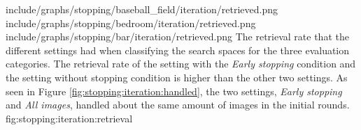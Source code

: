 \tripfigure
{include/graphs/stopping/baseball_field/iteration/retrieved.png}
{include/graphs/stopping/bedroom/iteration/retrieved.png}
{include/graphs/stopping/bar/iteration/retrieved.png}
{The retrieval rate that the different settings had when classifying the search spaces for the three evaluation categories. The retrieval rate of the setting with the \emph{Early stopping} condition and the setting without stopping condition is higher than the other two settings. As seen in Figure \ref{fig:stopping:iteration:handled}, the two settings, \emph{Early stopping} and \emph{All images}, handled about the same amount of images in the initial rounds.}
{fig:stopping:iteration:retrieval}
